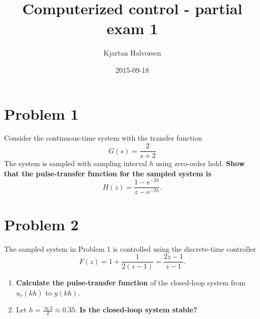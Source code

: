 \documentclass{scrartcl}
\author{Kjartan Halvorsen}
\date{2015-09-18}
\title{Computerized control - partial exam 1}
\newcommand*{\mexp}[1]{\ensuremath{\mathrm{e}^{#1}}}
\begin{document}
\maketitle

\section*{Problem 1}
\label{sec-1}
Consider the continuous-time system with the transfer function
\[ G(s) = \frac{2}{s+2} \]
The system is sampled with sampling interval $h$ using zero-order hold. \textbf{Show that the pulse-transfer function for the sampled system is}
\[ H(z) = \frac{1-\mexp{-2h}}{z-\mexp{-2h}}. \]

\section*{Problem 2}
\label{sec-2}
The sampled system in Problem 1 is controlled using the discrete-time controller
\[ F(z) = 1 + \frac{1}{2(z-1)} = \frac{2z-1}{z-1}. \]
\begin{center}

\end{center}

\begin{enumerate}
\item \textbf{Calculate the pulse-transfer function} of the closed-loop system from $u_c(kh)$ to $y(kh)$.
\item Let $h=\frac{\ln 2}{2} \approx 0.35$. \textbf{Is the closed-loop system stable?}
\end{enumerate}
\end{document}
